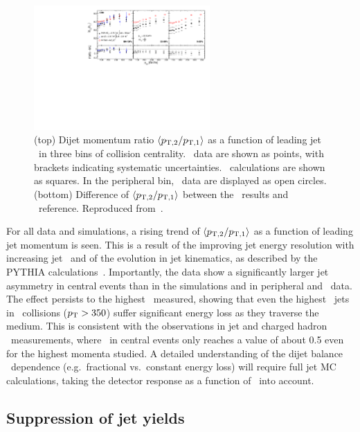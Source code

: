 \begin{figure}[!th]
\begin{center}
\includegraphics[width=0.6\textwidth]{jetfigures/deltaPtOverPt5_lead120_sub30_diff_20120103.pdf}
\caption{(top) Dijet momentum ratio $\langle p_{\rm{T},2}/p_{\rm{T},1} \rangle$ as a function of
leading jet \pT\ in three bins of collision centrality.
\PbPb\ data are shown as points, with brackets indicating systematic uncertainties.  
\PYTHYD\ calculations are shown as squares. In the peripheral bin,
\pp\ data are displayed as open circles.
(bottom) Difference of $\langle p_{\rm{T},2}/p_{\rm{T},1} \rangle$ between the \PbPb\ results and \PYTHYD\ reference.
Reproduced from~\cite{CMS_dijet}.}
\label{fig:GR:CMS_pt_ratio}
\end{center}
\end{figure}

For all data and simulations, a rising trend of $\langle p_{\rm{T},2}/p_{\rm{T},1} \rangle$ as a function
of leading jet momentum is seen. This is a result of the improving jet energy resolution
with increasing jet \pT\ and of the evolution in jet kinematics, as described by the PYTHIA
calculations~\cite{CMS_dijet}. Importantly, the data show a significantly larger jet asymmetry in central events
than in the simulations and in peripheral and \pp\ data. The effect persists to the
highest \pT\ measured, showing that even the highest \pT\ jets in \PbPb\ collisions ($\mbox{$p_{\mathrm{T}}$} > 350$\GeVc)
suffer significant energy loss as they traverse the medium. This is consistent with the 
observations in jet and charged hadron \Raa\ measurements, where \Raa\ in central events 
only reaches a value of about 0.5 even for the highest momenta studied.
A detailed understanding of the dijet balance 
\pT\ dependence (e.g.\ fractional vs.\ constant energy loss) will require full jet MC calculations,
taking the detector response as a function of \pT\ into account.

\subsection{Suppression of jet yields}

